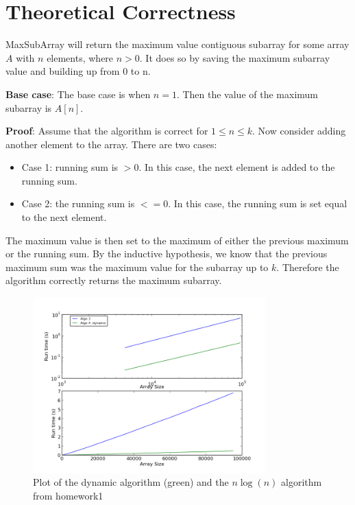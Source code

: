 \documentclass[a4paper,12pt]{article}
\begin{document}
\section*{Theoretical Correctness}

MaxSubArray will return the maximum value contiguous subarray for some array $A$ with $n$ elements, where $n>0$. It does so by saving the maximum subarray value and building up from 0 to n. 

\textbf{Base case}: The base case is when $n=1$. Then the value of the maximum subarray is $A[n]$.

\textbf{Proof}: Assume that the algorithm is correct for $1\leq n \leq k$. Now consider adding another element to the array. There are two cases:

\begin{itemize}


\item Case 1: running sum is $> 0$. In this case, the next element is added to the running sum.

\item Case 2: the running sum is $<= 0$. In this case, the running sum is set equal to the next element. 

\end{itemize}

The maximum value is then set to the maximum of either the previous maximum or the running sum. By the inductive hypothesis, we know that the previous maximum sum was the maximum value for the subarray up to $k$. Therefore the algorithm correctly returns the maximum subarray.


\pagebreak
 
\begin{figure}[h!]
\centering
\includegraphics[width=0.8\textwidth]{algo4runtime}
\caption{Plot of the dynamic algorithm (green) and the $n\log(n)$ algorithm from homework1}
\end{figure} 
\end{document}
